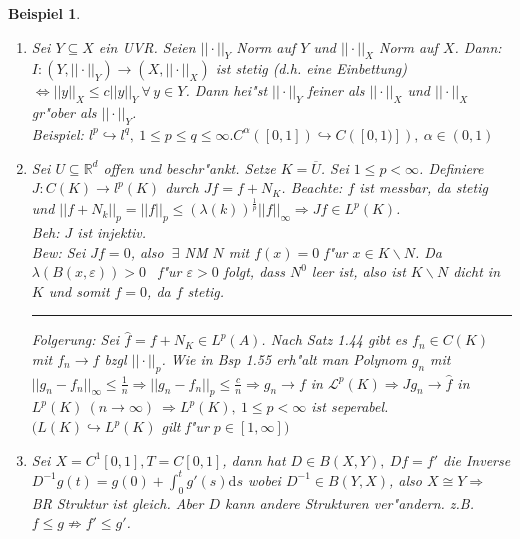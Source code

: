 \documentclass[a4paper,11pt]{book}
\newcommand{\R}{{\mathbb R}}
\newcommand{\sL}{{\mathcal L}}
\newcommand{\sn}[1]{||#1||_{\infty}}
\newcommand{\eps}{{\varepsilon}}
\newcommand{\eb}{\begin{flushright} \rule{1ex}{1ex} \end{flushright}}
\def\d{\mbox{d}}
\newtheorem{Bsp}[Def]{Beispiel}
\theoremstyle{nonumberplain}
\begin{document}
\begin{Bsp}
\begin{enumerate}
\item[a)] Sei $Y \subseteq X$ ein UVR. Seien $||\cdot||_Y$ Norm auf $Y$ und $||\cdot||_X$ Norm auf $X$. Dann: $I: (Y,||\cdot||_Y) \rightarrow (X,||\cdot||_X)$ ist stetig (d.h. eine Einbettung) $\Longleftrightarrow ||y||_X \leq c ||y||_Y \ \forall\, y \in Y$. Dann hei"st $||\cdot||_Y$ feiner als $||\cdot||_X$ und $||\cdot||_X$ gr"ober als $||\cdot||_Y$.\\
Beispiel: $l^p \hookrightarrow l^q,\ 1 \leq p \leq q \leq \infty. C^{\alpha}([0,1]) \hookrightarrow C([0,1)]),\ \alpha \in (0,1)$

\item[b)] Sei $U \subseteq \R^d$ offen und beschr"ankt. Setze $K = \overline{U}$. Sei $1 \leq p < \infty$. Definiere $J: C(K) \rightarrow l^p(K)$ durch $Jf = f+N_K$. Beachte: $f$ ist messbar, da stetig und $||f + N_k||_p = ||f||_p \leq (\lambda(k))^{\frac1{p}} \sn{f} \Rightarrow Jf \in L^p(K)$.\\
\emph{Beh:} $J$ ist injektiv.\\
\emph{Bew:} Sei $Jf = 0$, also $\ \exists$ NM $N$ mit $f(x) = 0$ f"ur $x \in K \backslash N$. Da $\lambda(B(x,\eps)) > 0$ \ f"ur $\eps > 0$ folgt, dass $N^0$ leer ist, also ist $K \backslash N$ dicht in $K$ und somit $f = 0$, da $f$ stetig. \eb
Folgerung: Sei $\hat{f} = f + N_K \in L^p(A)$. Nach Satz 1.44 gibt es $f_n \in C(K)$ mit $f_n \rightarrow f$ bzgl $||\cdot||_p$. Wie in Bsp 1.55 erh"alt man Polynom $g_n$ mit $\sn{g_n - f_n} \leq \frac1{n} \Rightarrow ||g_n-f_n||_p \leq \frac{c}{n} \Rightarrow g_n \rightarrow f$ in $\sL^p(K) \Rightarrow Jg_n \rightarrow \hat{f}$ in $L^p(K)\ (n \rightarrow \infty) \ \Rightarrow L^p(K),\ 1 \leq p < \infty$ ist seperabel. $(L(K) \hookrightarrow L^p(K)$ gilt f"ur $p \in [1,\infty])$

\item[c)] Sei $X=C^1[0,1], T=C[0,1]$, dann hat $D \in B(X,Y),\ Df = f'$ die Inverse $D^{-1}g(t) = g(0) + \int_0^t g'(s)\d s$ wobei $D^{-1} \in B(Y,X)$, also $X \cong Y \Rightarrow$ BR Struktur ist gleich. Aber $D$ kann andere Strukturen ver"andern. z.B. $f \leq g \not\Rightarrow f' \leq g'$.
\end{enumerate}
\end{Bsp}
\end{document}
